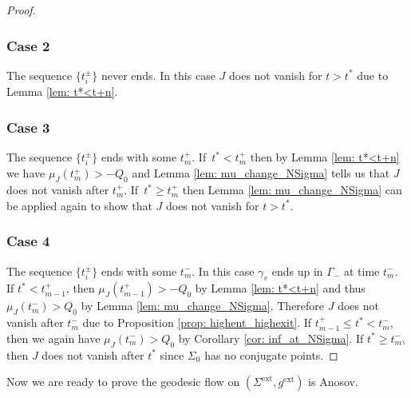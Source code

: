 \documentclass[10pt]{amsart}
\newcommand{\ext}{\mathrm{ext}}
\theoremstyle{definition}
\renewcommand{\>}{{\rangle}}
\newcommand{\<}{{\langle}}
\begin{document}
\begin{proof}
\subsubsection*{Case 2} The sequence $\{t_i^{\pm}\}$ never ends. In this case $J$ does not vanish for $t>t^*$ due to Lemma \ref{lem: t*<t+n}.

\subsubsection*{Case 3} The sequence $\{t_i^{\pm}\}$ ends with some $t^+_m$. If~$t^*<t^+_m$ then by Lemma \ref{lem: t*<t+n} we have $\mu_J(t^+_{m})>-Q_0$ and Lemma \ref{lem: mu_change_NSigma} tells us that $J$ does not vanish after $t^+_m$. If~$t^*\geq t^+_m$ then Lemma \ref{lem: mu_change_NSigma} can be applied again to show that $J$ does not vanish for $t>t^*$.

\subsubsection*{Case 4} The sequence $\{t_i^{\pm}\}$ ends with some $t^-_m$. In this case $\gamma_v$ ends up in $\Gamma_-$ at time $t^-_m$. If $t^*<t^+_{m-1}$, then $\mu_J(t^+_{m-1})>-Q_0$ by Lemma \ref{lem: t*<t+n} and thus $\mu_J(t^-_{m})>Q_0$ by Lemma \ref{lem: mu_change_NSigma}. Therefore $J$ does not vanish after $t^-_{m}$ due to Proposition \ref{prop: highent_highexit}. If $t^+_{m-1}\leq t^*<t^-_{m}$, then we again have $\mu_J(t^-_{m})>Q_0$ by Corollary \ref{cor: inf_at_NSigma}. If $t^*\geq t^-_{m}$, then $J$ does not vanish after $t^*$ since $\Sigma_0$ has no conjugate points.
\end{proof}

Now we are ready to prove the geodesic flow on $(\Sigma^{\ext}, g^{\ext})$ is Anosov.
\end{document}
